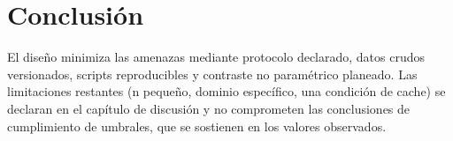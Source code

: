 \section{Conclusión}

El diseño minimiza las amenazas mediante protocolo declarado, datos crudos
versionados, scripts reproducibles y contraste no paramétrico planeado. Las
limitaciones restantes (n pequeño, dominio específico, una condición de cache)
se declaran en el capítulo de discusión y no comprometen las conclusiones de
cumplimiento de umbrales, que se sostienen en los valores observados.